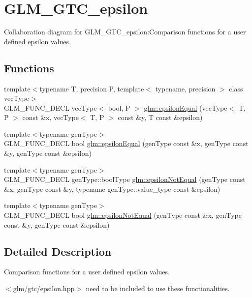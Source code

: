 \hypertarget{group__gtc__epsilon}{
\section{GLM\_\-GTC\_\-epsilon}
\label{group__gtc__epsilon}
}


Collaboration diagram for GLM\_\-GTC\_\-epsilon:Comparison functions for a user defined epsilon values.  
\subsection*{Functions}
\begin{CompactItemize}
\item 
{\footnotesize template$<$typename T, precision P, template$<$ typename, precision $>$ class vecType$>$ }\\GLM\_\-FUNC\_\-DECL vecType$<$ bool, P $>$ \hyperlink{group__gtc__epsilon_g7051ff93341ffb11d864e88d4bc0e3d8}{glm::epsilonEqual} (vecType$<$ T, P $>$ const \&x, vecType$<$ T, P $>$ const \&y, T const \&epsilon)
\item 
{\footnotesize template$<$typename genType$>$ }\\GLM\_\-FUNC\_\-DECL bool \hyperlink{group__gtc__epsilon_g98e0b3362c11f76fc16f5fa9b27435d8}{glm::epsilonEqual} (genType const \&x, genType const \&y, genType const \&epsilon)
\item 
{\footnotesize template$<$typename genType$>$ }\\GLM\_\-FUNC\_\-DECL genType::boolType \hyperlink{group__gtc__epsilon_g3958ccc0b5aa101c4b6eea41a2f2d51a}{glm::epsilonNotEqual} (genType const \&x, genType const \&y, typename genType::value\_\-type const \&epsilon)
\item 
{\footnotesize template$<$typename genType$>$ }\\GLM\_\-FUNC\_\-DECL bool \hyperlink{group__gtc__epsilon_gcdfcf5e1180e8147b0619c0743e3eb7d}{glm::epsilonNotEqual} (genType const \&x, genType const \&y, genType const \&epsilon)
\end{CompactItemize}


\subsection{Detailed Description}
Comparison functions for a user defined epsilon values. 

$<$glm/gtc/epsilon.hpp$>$ need to be included to use these functionalities. 


